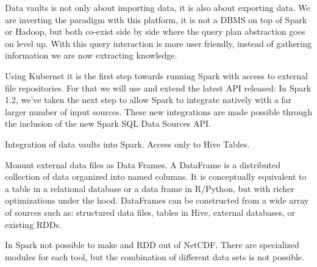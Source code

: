Data vaults is not only about importing data, it is also about exporting data. We are inverting the paradigm
with this platform, it is not a DBMS on top of Spark or Hadoop, but both co-exist side by side where the query
plan abstraction goes on level up. With this query interaction is more user friendly, instead of gathering
information we are now extracting knowledge.

Using Kubernet it is the first step towards running Spark with access to external file repositories. For that
we will use and extend the latest API released: %
In Spark 1.2, we’ve taken the next step to allow Spark to integrate natively with a far larger number of
input sources.  These new integrations are made possible through the inclusion of the new Spark SQL Data Sources API.

Integration of data vaults into Spark. Access only to Hive Tables.

Monunt external data files as Data Frames. A DataFrame is a distributed collection of data organized into
named columns. It is conceptually equivalent to a table in a relational database or a data frame in R/Python,
but with richer optimizations under the hood. DataFrames can be constructed from a wide array of sources
such as: structured data files, tables in Hive, external databases, or existing RDDs.

In Spark not possible to make and RDD out of NetCDF.
There are specialized modules for each tool, but the combination of different data sets is not possible.

